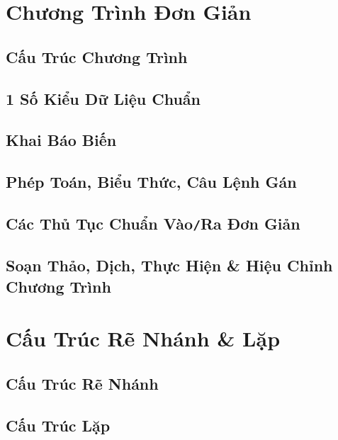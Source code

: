 \documentclass[oneside]{book}
\numberwithin{equation}{section}
\begin{document}
\chapter{Chương Trình Đơn Giản}

\section{Cấu Trúc Chương Trình}

\section{1 Số Kiểu Dữ Liệu Chuẩn}

\section{Khai Báo Biến}

\section{Phép Toán, Biểu Thức, Câu Lệnh Gán}

\section{Các Thủ Tục Chuẩn Vào\texttt{/}Ra Đơn Giản}

\section{Soạn Thảo, Dịch, Thực Hiện \& Hiệu Chỉnh Chương Trình}


\chapter{Cấu Trúc Rẽ Nhánh \& Lặp}

\section{Cấu Trúc Rẽ Nhánh}

\section{Cấu Trúc Lặp}

\end{document}
